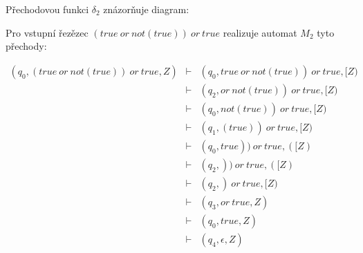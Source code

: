 \documentclass[a4paper,11pt]{article}[24.3.2010]
\begin{document}
\begin{enumerate}
  Přechodovou funkci $\delta_{2}$ znázorňuje diagram:\\

\begin{figure}[h!]
        \begin{center}
        \end{center}
        \end{figure}

  \newpage

  Pro vstupní řezězec $(true \: or \: not(true)) \: or \: true$ realizuje automat $M_2$ tyto přechody:

  \begin{eqnarray*}
  (q_{0}, (true \: or \: not(true)) \: or \: true, Z)&\vdash&(q_{0}, true \: or \: not(true)) \: or \: true, [Z)\\
  &\vdash&(q_{2}, or \: not(true)) \: or \: true, [Z)\\
  &\vdash&(q_{0}, not(true)) \: or \: true, [Z)\\
  &\vdash&(q_{1}, (true)) \: or \: true, [Z)\\
  &\vdash&(q_{0}, true)) \: or \: true, ([Z)\\
  &\vdash&(q_{2}, )) \: or \: true, ([Z)\\
  &\vdash&(q_{2}, ) \: or \: true, [Z)\\
  &\vdash&(q_{3}, or \: true, Z)\\
  &\vdash&(q_{0}, true, Z)\\
  &\vdash&(q_{4}, \epsilon, Z)\\
  \end{eqnarray*}


\end{enumerate}
\end{document}
